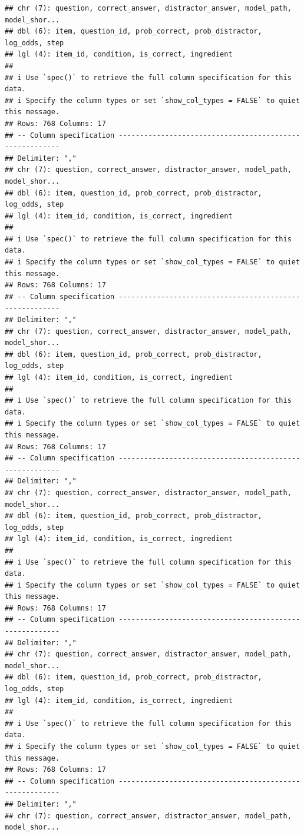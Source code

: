 \documentclass[
]{article}
\begin{document}
\begin{verbatim}
## chr (7): question, correct_answer, distractor_answer, model_path, model_shor...
## dbl (6): item, question_id, prob_correct, prob_distractor, log_odds, step
## lgl (4): item_id, condition, is_correct, ingredient
## 
## i Use `spec()` to retrieve the full column specification for this data.
## i Specify the column types or set `show_col_types = FALSE` to quiet this message.
## Rows: 768 Columns: 17
## -- Column specification --------------------------------------------------------
## Delimiter: ","
## chr (7): question, correct_answer, distractor_answer, model_path, model_shor...
## dbl (6): item, question_id, prob_correct, prob_distractor, log_odds, step
## lgl (4): item_id, condition, is_correct, ingredient
## 
## i Use `spec()` to retrieve the full column specification for this data.
## i Specify the column types or set `show_col_types = FALSE` to quiet this message.
## Rows: 768 Columns: 17
## -- Column specification --------------------------------------------------------
## Delimiter: ","
## chr (7): question, correct_answer, distractor_answer, model_path, model_shor...
## dbl (6): item, question_id, prob_correct, prob_distractor, log_odds, step
## lgl (4): item_id, condition, is_correct, ingredient
## 
## i Use `spec()` to retrieve the full column specification for this data.
## i Specify the column types or set `show_col_types = FALSE` to quiet this message.
## Rows: 768 Columns: 17
## -- Column specification --------------------------------------------------------
## Delimiter: ","
## chr (7): question, correct_answer, distractor_answer, model_path, model_shor...
## dbl (6): item, question_id, prob_correct, prob_distractor, log_odds, step
## lgl (4): item_id, condition, is_correct, ingredient
## 
## i Use `spec()` to retrieve the full column specification for this data.
## i Specify the column types or set `show_col_types = FALSE` to quiet this message.
## Rows: 768 Columns: 17
## -- Column specification --------------------------------------------------------
## Delimiter: ","
## chr (7): question, correct_answer, distractor_answer, model_path, model_shor...
## dbl (6): item, question_id, prob_correct, prob_distractor, log_odds, step
## lgl (4): item_id, condition, is_correct, ingredient
## 
## i Use `spec()` to retrieve the full column specification for this data.
## i Specify the column types or set `show_col_types = FALSE` to quiet this message.
## Rows: 768 Columns: 17
## -- Column specification --------------------------------------------------------
## Delimiter: ","
## chr (7): question, correct_answer, distractor_answer, model_path, model_shor...

\end{verbatim}
\end{document}
